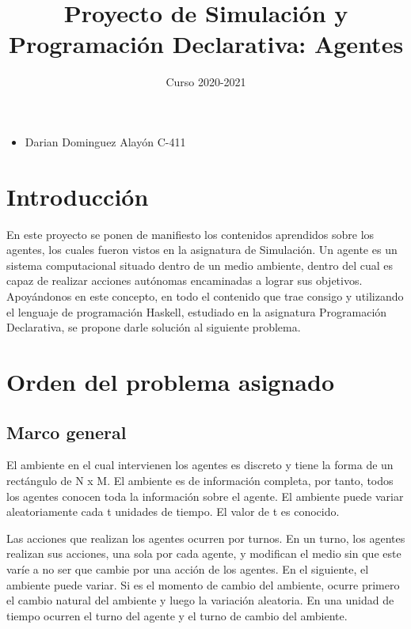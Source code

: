 \documentclass[a4paper,10pt]{article}
\title{Proyecto de Simulación y Programación Declarativa: Agentes }
\date{Curso 2020-2021}
\begin{document}
\maketitle
{}

  \begin{itemize}
      \item Darian Dominguez Alayón C-411
    \end{itemize}

\section*{Introducci\'on}\label{sec:intro}
En este proyecto se ponen de manifiesto los contenidos aprendidos sobre los agentes, los cuales fueron vistos en la asignatura de Simulaci\'on. Un agente es un sistema computacional situado dentro de un medio ambiente, dentro del cual es capaz de realizar acciones autónomas encaminadas a lograr sus objetivos. Apoy\'andonos en este concepto, en todo el contenido que trae consigo y utilizando el lenguaje de programaci\'on Haskell, estudiado en la asignatura Programaci\'on Declarativa, se propone darle soluci\'on al siguiente problema.

\section*{Orden del problema asignado}
\subsection*{Marco general}
  El ambiente en el cual intervienen los agentes es discreto y tiene la forma de un rect\'angulo de N x M. El ambiente es de informaci\'on completa, por tanto, todos los agentes conocen toda la informaci\'on sobre el agente. El ambiente puede variar aleatoriamente cada t unidades de tiempo. El valor de t es conocido.
  
  Las acciones que realizan los agentes ocurren por turnos. En un turno, los agentes realizan sus acciones, una sola por cada agente, y modifican el medio sin que este var\'ie a no ser que cambie por una acci\'on de los agentes. En el siguiente, el ambiente puede variar. Si es el momento de cambio del ambiente, ocurre primero el cambio natural del ambiente y luego la variaci\'on aleatoria. En una unidad de tiempo ocurren el turno del agente y el turno de cambio del ambiente.
  
\end{document}
